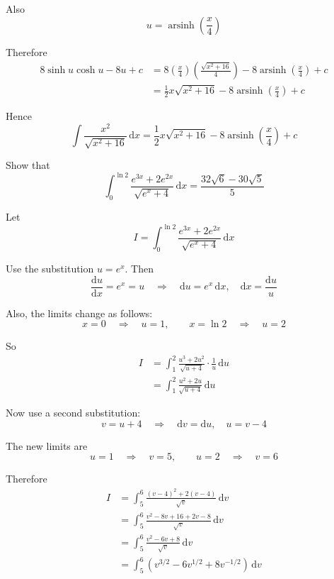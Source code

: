 \documentclass[leqno]{article}
\begin{document}
\begin{enumerate}[
  label=\textbf{\arabic*.},
  leftmargin=*,
  topsep=0pt,
  partopsep=0pt,
  parsep=0pt
]
\begin{djsSolution}
Also
\[
u=\operatorname{arsinh}\left(\frac{x}{4}\right)
\]

Therefore
\begin{align*}
8\sinh u\cosh u-8u+c
&=8\left(\frac{x}{4}\right)\left(\frac{\sqrt{x^2+16}}{4}\right)-8\operatorname{arsinh}\left(\frac{x}{4}\right)+c \\
&=\frac{1}{2}x\sqrt{x^2+16}-8\operatorname{arsinh}\left(\frac{x}{4}\right)+c
\end{align*}

Hence
\[
\int \frac{x^2}{\sqrt{x^2+16}}\,\mathrm{d}x
=
\frac{1}{2}x\sqrt{x^2+16}-8\operatorname{arsinh}\left(\frac{x}{4}\right)+c
\]
\end{djsSolution}


\newpage

\questionitem

Show that
\[
\int_0^{\ln 2} \frac{e^{3x}+2e^{2x}}{\sqrt{e^x+4}}\,\mathrm{d}x = \frac{32\sqrt{6}-30\sqrt{5}}{5}
\]

\vspace*{10pt}

\begin{djsSolution}
Let
\[
I=\int_0^{\ln 2} \frac{e^{3x}+2e^{2x}}{\sqrt{e^x+4}}\,\mathrm{d}x
\]

Use the substitution $u=e^x$. Then
\[
\frac{\mathrm{d}u}{\mathrm{d}x}=e^x=u
\quad\Longrightarrow\quad
\mathrm{d}u=e^x\,\mathrm{d}x,\quad \mathrm{d}x=\frac{\mathrm{d}u}{u}
\]

Also, the limits change as follows:
\[
x=0\quad\Longrightarrow\quad u=1,\qquad x=\ln 2\quad\Longrightarrow\quad u=2
\]

So
\begin{align*}
I&=\int_1^2 \frac{u^3+2u^2}{\sqrt{u+4}}\cdot \frac{1}{u}\,\mathrm{d}u\\
&=\int_1^2 \frac{u^2+2u}{\sqrt{u+4}}\,\mathrm{d}u
\end{align*}

Now use a second substitution:
\[
v=u+4
\quad\Longrightarrow\quad
\mathrm{d}v=\mathrm{d}u,\quad u=v-4
\]

The new limits are
\[
u=1\quad\Longrightarrow\quad v=5,\qquad u=2\quad\Longrightarrow\quad v=6
\]

Therefore
\begin{align*}
I&=\int_5^6 \frac{(v-4)^2+2(v-4)}{\sqrt v}\,\mathrm{d}v\\
&=\int_5^6 \frac{v^2-8v+16+2v-8}{\sqrt v}\,\mathrm{d}v\\
&=\int_5^6 \frac{v^2-6v+8}{\sqrt v}\,\mathrm{d}v\\
&=\int_5^6 \left(v^{3/2}-6v^{1/2}+8v^{-1/2}\right)\,\mathrm{d}v
\end{align*}


\end{djsSolution}
\end{enumerate}
\end{document}

